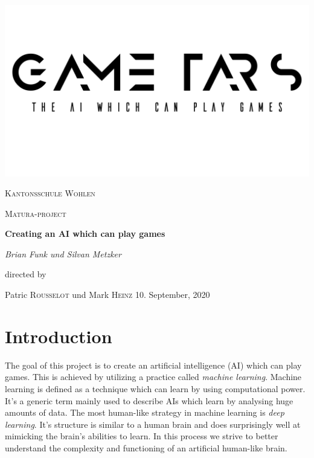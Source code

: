 \documentclass[12pt]{article}
\begin{document}

\begin{titlepage}
    \centering
    \includegraphics[width=1\textwidth]{pictures/title.pdf}\par\vspace{0.5cm}
    {\scshape\LARGE Kantonsschule Wohlen \par}
    \vspace{0.2cm}
    {\scshape\Large Matura-project\par}
    \vspace{2cm}
    {\huge\bfseries Creating an AI which can play games\par}
    \vspace{2cm}
    {\Large\itshape Brian Funk und Silvan Metzker\par}
    \vfill
    directed by\par
    Patric \textsc{Rousselot} und Mark \textsc{Heinz}
    \vfill 
    {10. September, 2020}
\end{titlepage}
\tableofcontents
\newpage

\section{Introduction}
The goal of this project is to create an artificial intelligence (AI) which can play games. This is achieved by utilizing a practice called \textit{machine learning}. Machine learning is defined as a technique which can learn by using computational power. It's a generic term mainly used to describe AIs which learn by analysing huge amounts of data. 
The most human-like strategy in machine learning is \textit{deep learning}. It's structure is similar to a human brain and does surprisingly well at mimicking the brain's abilities to learn. In this process we strive to better understand the complexity and functioning of an artificial human-like brain. 
\end{document}
